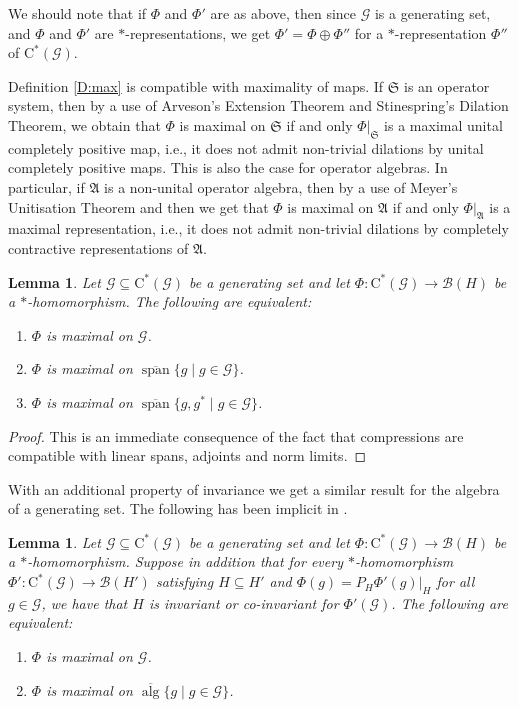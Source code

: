 \documentclass[11pt, draft]{amsart}
\numberwithin{equation}{section}
\theoremstyle{plain}
\newtheorem{lemma}[theorem]{Lemma}
\theoremstyle{definition}
\theoremstyle{remark}
\newcommand{\B}{{\mathcal{B}}}
\newcommand{\G}{{\mathcal{G}}}
\newcommand{\fA}{{\mathfrak{A}}}
\newcommand{\fS}{{\mathfrak{S}}}
\newcommand{\ca}{\mathrm{C}^*}
\newcommand{\ol}{\overline}
\newcommand{\alg}{\operatorname{alg}}
\newcommand{\spn}{\operatorname{span}}
\begin{document}
We should note that if $\Phi$ and $\Phi'$ are as above, then since $\G$ is a generating set, and $\Phi$ and $\Phi'$ are $*$-representations, we get $\Phi'=\Phi\oplus \Phi''$ for a $*$-representation $\Phi''$ of $\ca(\G)$. 

Definition \ref{D:max} is compatible with maximality of maps.
If $\fS$ is an operator system, then by a use of Arveson's Extension Theorem and Stinespring's Dilation Theorem, we obtain that $\Phi$ is maximal on $\fS$ if and only $\Phi|_\fS$ is a maximal unital completely positive map, i.e., it does not admit non-trivial dilations by unital completely positive maps. 
This is also the case for operator algebras. 
In particular, if $\fA$ is a non-unital operator algebra, then by a use of Meyer's Unitisation Theorem and then \cite[Corollary 7.7]{Pau02} we get that $\Phi$ is maximal on $\fA$ if and only $\Phi|_\fA$ is a maximal representation, i.e., it does not admit non-trivial dilations by completely contractive representations of $\fA$.

\begin{lemma} \label{L:iffmaxspace}
Let $\G\subseteq \ca(\G)$ be a generating set and let $\Phi\colon \ca(\G)\to \B(H)$ be a $*$-homomor\-phism. 
The following are equivalent:
\begin{enumerate}
\item $\Phi$ is maximal on $\G$.
\item $\Phi$ is maximal on $\ol{\spn}\{g \mid g \in \G\}$.
\item $\Phi$ is maximal on $\ol{\spn}\{g, g^* \mid g \in \G\}$.
\end{enumerate}
\end{lemma}

\begin{proof}
This is an immediate consequence of the fact that compressions are compatible with linear spans, adjoints and norm limits.
\end{proof}

With an additional property of invariance we get a similar result for the algebra of a generating set.
The following has been implicit in \cite[proof of Claim in Theorem 3.5]{KK12}.

\begin{lemma} \label{L:iffmaxalg}
Let $\G\subseteq \ca(\G)$ be a generating set and let $\Phi\colon \ca(\G)\to \B(H)$ be a $*$-homomor\-phism.
Suppose in addition that for every $*$-homomorphism $\Phi' \colon \ca(\G) \to \B(H')$ satisfying $H \subseteq H'$ and $\Phi(g) = P_H \Phi'(g) |_H$ for all $g \in \G$, we have that $H$ is invariant or co-invariant for $\Phi'(\G)$.
The following are equivalent:
\begin{enumerate}
\item $\Phi$ is maximal on $\G$.
\item $\Phi$ is maximal on $\ol{\alg}\{g \mid g \in \G\}$.
\end{enumerate}
\end{lemma}
\end{document}
